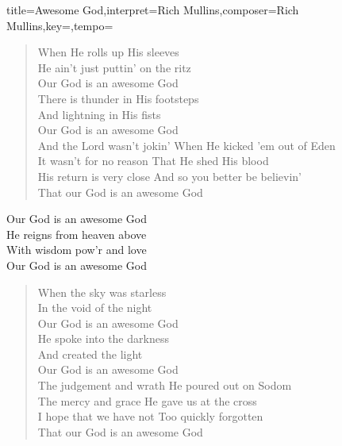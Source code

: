 \documentclass{leadsheet-modern}
\begin{document}
\begin{song}{title={Awesome God},interpret={Rich Mullins},composer={Rich Mullins},key={},tempo={}}

\begin{schedule}
\end{schedule}

\begin{intro}
\end{intro}

\begin{verse}
When He rolls up His sleeves \\
He ain't just puttin' on the ritz \\
Our God is an awesome God \\
There is thunder in His footsteps \\
And lightning in His fists \\
Our God is an awesome God \\
And the Lord wasn't jokin' When He kicked 'em out of Eden \\
It wasn't for no reason That He shed His blood \\
His return is very close And so you better be believin' \\
That our God is an awesome God
\end{verse}

\begin{chorus}
Our God is an awesome God \\
He reigns from heaven above \\
With wisdom pow'r and love \\
Our God is an awesome God
\end{chorus}

\begin{verse}
When the sky was starless \\
In the void of the night \\
Our God is an awesome God \\
He spoke into the darkness \\
And created the light \\
Our God is an awesome God \\
The judgement and wrath He poured out on Sodom \\
The mercy and grace He gave us at the cross \\
I hope that we have not Too quickly forgotten \\
That our God is an awesome God
\end{verse}

\end{song}
\end{document}
